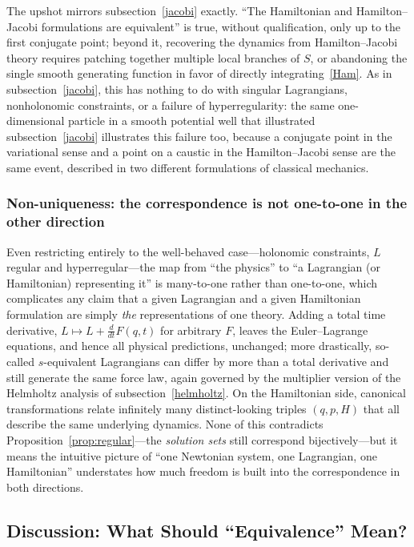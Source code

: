 The upshot mirrors subsection~\ref{jacobi} exactly. ``The Hamiltonian and
Hamilton--Jacobi formulations are equivalent'' is true, without qualification,
only up to the first conjugate point; beyond it, recovering the dynamics from
Hamilton--Jacobi theory requires patching together multiple local branches of
$S$, or abandoning the single smooth generating function in favor of directly
integrating~\eqref{Ham}. As in subsection~\ref{jacobi}, this has nothing to do
with singular Lagrangians, nonholonomic constraints, or a failure of
hyperregularity: the same one-dimensional particle in a smooth potential well
that illustrated subsection~\ref{jacobi} illustrates this failure too, because
a conjugate point in the variational sense and a point on a caustic in the
Hamilton--Jacobi sense are the same event, described in two different
formulations of classical mechanics.

\subsubsection{Non-uniqueness: the correspondence is not one-to-one in the other direction}
\label{nonunique}

Even restricting entirely to the well-behaved case---holonomic constraints, $L$
regular and hyperregular---the map from ``the physics'' to ``a Lagrangian (or
Hamiltonian) representing it'' is many-to-one rather than one-to-one, which
complicates any claim that a given Lagrangian and a given Hamiltonian
formulation are simply \emph{the} representations of one theory. Adding a total
time derivative, $L \mapsto L + \frac{d}{dt}F(q,t)$ for arbitrary $F$, leaves
the Euler--Lagrange equations, and hence all physical predictions, unchanged;
more drastically, so-called $s$-equivalent Lagrangians can differ by more than
a total derivative and still generate the same force law, again governed by the
multiplier version of the Helmholtz analysis of subsection~\ref{helmholtz}. On
the Hamiltonian side, canonical transformations relate infinitely many
distinct-looking triples $(q,p,H)$ that all describe the same underlying
dynamics. None of this contradicts Proposition~\ref{prop:regular}---the
\emph{solution sets} still correspond bijectively---but it means the intuitive
picture of ``one Newtonian system, one Lagrangian, one Hamiltonian''
understates how much freedom is built into the correspondence in both
directions.

\subsection{Discussion: What Should ``Equivalence'' Mean?}
\label{discussion}

